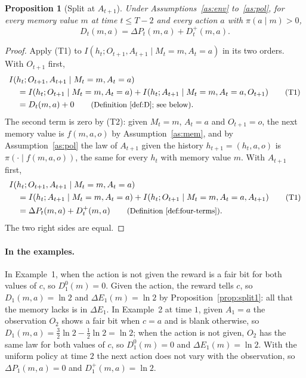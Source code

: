 \documentclass{article}
\newtheorem{proposition}{Proposition}[section]
\theoremstyle{definition}
\newcommand{\dE}{\Delta E}
\newcommand{\dP}{\Delta P}
\newcommand{\why}[1]{\tag*{\small(#1)}}
\begin{document}
\begin{proposition}[Split at $A_{t+1}$]\label{prop:split2}
Under Assumptions~\ref{as:env} to~\ref{as:pol}, for every memory value $m$ at time $t\le T-2$ and every action $a$ with $\pi(a\mid m)>0$,
\[
D_t(m,a)=\dP_t(m,a)+D^+_t(m,a).
\]
\end{proposition}

\begin{proof}
Apply (T1) to $I(h_t;O_{t+1},A_{t+1}\mid M_t=m,A_t=a)$ in its two orders. With $O_{t+1}$ first,
\begin{align*}
&I(h_t;O_{t+1},A_{t+1}\mid M_t=m,A_t=a)\\
&\quad=I(h_t;O_{t+1}\mid M_t=m,A_t=a)+I(h_t;A_{t+1}\mid M_t=m,A_t=a,O_{t+1}) \why{T1}\\
&\quad=D_t(m,a)+0 \why{Definition~\ref{def:D}; see below}.
\end{align*}
The second term is zero by (T2): given $M_t=m$, $A_t=a$ and $O_{t+1}=o$, the next memory value is $f(m,a,o)$ by Assumption~\ref{as:mem}, and by Assumption~\ref{as:pol} the law of $A_{t+1}$ given the history $h_{t+1}=(h_t,a,o)$ is $\pi(\cdot\mid f(m,a,o))$, the same for every $h_t$ with memory value $m$. With $A_{t+1}$ first,
\begin{align*}
&I(h_t;O_{t+1},A_{t+1}\mid M_t=m,A_t=a)\\
&\quad=I(h_t;A_{t+1}\mid M_t=m,A_t=a)+I(h_t;O_{t+1}\mid M_t=m,A_t=a,A_{t+1}) \why{T1}\\
&\quad=\dP_t(m,a)+D^+_t(m,a) \why{Definition~\ref{def:four-terms}}.
\end{align*}
The two right sides are equal.
\end{proof}

\paragraph{In the examples.} In Example~1, when the action is not given the reward is a fair bit for both values of $c$, so $D^0_1(m)=0$. Given the action, the reward tells $c$, so $D_1(m,a)=\ln2$ and $\dE_1(m)=\ln2$ by Proposition~\ref{prop:split1}: all that the memory lacks is in $\dE_1$. In Example~2 at time $1$, given $A_1=a$ the observation $O_2$ shows a fair bit when $c=a$ and is blank otherwise, so $D_1(m,a)=\tfrac32\ln2-\tfrac12\ln2=\ln2$; when the action is not given, $O_2$ has the same law for both values of $c$, so $D^0_1(m)=0$ and $\dE_1(m)=\ln2$. With the uniform policy at time $2$ the next action does not vary with the observation, so $\dP_1(m,a)=0$ and $D^+_1(m,a)=\ln2$.
\end{document}
